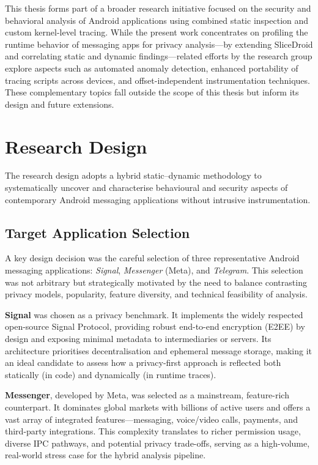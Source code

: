 \documentclass[a4paper,12pt]{report}
\begin{document}
This thesis forms part of a broader research initiative focused on the security and behavioral analysis of Android applications using combined static inspection and custom kernel-level tracing. While the present work concentrates on profiling the runtime behavior of messaging apps for privacy analysis—by extending SliceDroid and correlating static and dynamic findings—related efforts by the research group explore aspects such as automated anomaly detection, enhanced portability of tracing scripts across devices, and offset-independent instrumentation techniques. These complementary topics fall outside the scope of this thesis but inform its design and future extensions.

\section{Research Design}

The research design adopts a hybrid static–dynamic methodology to systematically uncover and characterise behavioural and security aspects of contemporary Android messaging applications without intrusive instrumentation.

\subsection{Target Application Selection}

A key design decision was the careful selection of three representative Android messaging applications: \textit{Signal}, \textit{Messenger} (Meta), and \textit{Telegram}. This selection was not arbitrary but strategically motivated by the need to balance contrasting privacy models, popularity, feature diversity, and technical feasibility of analysis.

\textbf{Signal} was chosen as a privacy benchmark. It implements the widely respected open-source Signal Protocol, providing robust end-to-end encryption (E2EE) by design and exposing minimal metadata to intermediaries or servers. Its architecture prioritises decentralisation and ephemeral message storage, making it an ideal candidate to assess how a privacy-first approach is reflected both statically (in code) and dynamically (in runtime traces).

\textbf{Messenger}, developed by Meta, was selected as a mainstream, feature-rich counterpart. It dominates global markets with billions of active users and offers a vast array of integrated features—messaging, voice/video calls, payments, and third-party integrations. This complexity translates to richer permission usage, diverse IPC pathways, and potential privacy trade-offs, serving as a high-volume, real-world stress case for the hybrid analysis pipeline.
\end{document}
